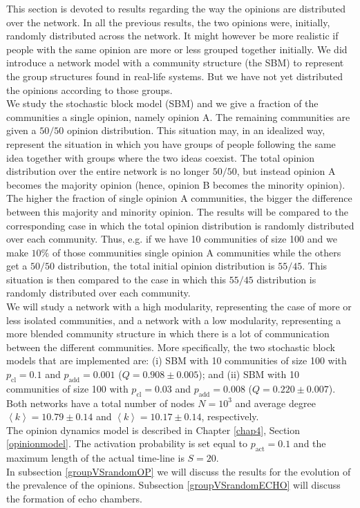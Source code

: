 \documentclass[11 pt , letterpaper , twoside , openright]{book}
\begin{document}
This section is devoted to results regarding the way the opinions are distributed over the network. In all the previous results, the two opinions were, initially, randomly distributed across the network. It might however be more realistic if people with the same opinion are more or less grouped together initially. We did introduce a network model with a community structure (the SBM) to represent the group structures found in real-life systems. But we have not yet distributed the opinions according to those groups. \\
\newline
We study the stochastic block model (SBM) and we give a fraction of the communities a single opinion, namely opinion A. The remaining communities are given a $50/50$ opinion distribution. This situation may, in an idealized way, represent the situation in which you have groups of people following the same idea together with groups where the two ideas coexist. The total opinion distribution over the entire network is no longer $50/50$, but instead opinion A becomes the majority opinion (hence, opinion B becomes the minority opinion). The higher the fraction of single opinion A communities, the bigger the difference between this majority and minority opinion. The results will be compared to the corresponding case in which the total opinion distribution is randomly distributed over each community. Thus, e.g. if we have 10 communities of size 100 and we make $10 \%$ of those communities single opinion A communities while the others get a $50/50$ distribution, the total initial opinion distribution is $55/45$. This situation is then compared to the case in which this $55/45$ distribution is randomly distributed over each community.\\ 
\newline
We will study a network with a high modularity, representing the case of more or less isolated communities, and a network with a low modularity, representing a more blended community structure in which there is a lot of communication between the different communities. More specifically, the two stochastic block models that are implemented are: (i) SBM with 10 communities of size 100 with $p_{\text{cl}} = 0.1$ and $p_{\text{add}} = 0.001$ ($Q = 0.908 \pm 0.005$); and (ii) SBM with 10 communities of size 100 with $p_{\text{cl}} = 0.03$ and $p_{\text{add}} = 0.008$ ($Q = 0.220 \pm 0.007$). Both networks have a total number of nodes $N = 10^3$ and average degree $\left<k\right> = 10.79 \pm 0.14$ and $\left<k\right> = 10.17 \pm 0.14$, respectively.\\
\newline
The opinion dynamics model is described in Chapter \ref{chap4}, Section \ref{opinionmodel}. The activation probability is set equal to $p_{\text{act}} = 0.1$ and the maximum length of the actual time-line is $S=20$. \\
\newline
In subsection \ref{groupVSrandomOP} we will discuss the results for the evolution of the prevalence of the opinions. Subsection \ref{groupVSrandomECHO} will discuss the formation of echo chambers.
\end{document}
